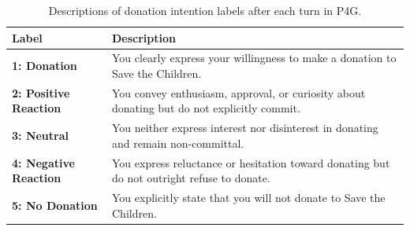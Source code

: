 \begin{table}[ht]
    \centering
    \small
    \begin{tabular}{ll}
        \toprule
        \textbf{Label} & \textbf{Description}\\
        \midrule
        \textbf{1: Donation} & You clearly express your willingness to make a donation to Save the Children. \\
        \textbf{2: Positive Reaction} & You convey enthusiasm, approval, or curiosity about donating but do not explicitly commit. \\
        \textbf{3: Neutral} & You neither express interest nor disinterest in donating and remain non-committal. \\
        \textbf{4: Negative Reaction} & You express reluctance or hesitation toward donating but do not outright refuse to donate. \\
        \textbf{5: No Donation} & You explicitly state that you will not donate to Save the Children. \\
        \bottomrule
    \end{tabular}
    \caption{Descriptions of donation intention labels after each turn in P4G.}
    \label{tab:final-intention}
\end{table}